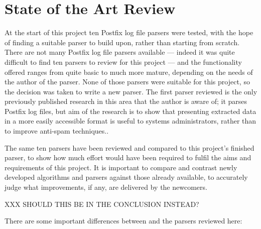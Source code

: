 \chapter{State of the Art Review}

\label{state of the art review}

At the start of this project ten Postfix log file parsers were tested, with
the hope of finding a suitable parser to build upon, rather than starting
from scratch.  There are not many Postfix log file parsers available ---
indeed it was quite difficult to find ten parsers to review for this
project --- and the functionality offered ranges from quite basic to much
more mature, depending on the needs of the author of the parser.  None of
those parsers were suitable for this project, so the decision was taken to
write a new parser.  The first parser reviewed is the only previously
published research in this area that the author is aware of; it parses
Postfix log files, but aim of the research is to show that presenting
extracted data in a more easily accessible format is useful to systems
administrators, rather than to improve anti-spam techniques..

The same ten parsers have been reviewed and compared to this project's
finished parser, to show how much effort would have been required to fulfil
the aims and requirements of this project.  It is important to compare and
contrast newly developed algorithms and parsers against those already
available, to accurately judge what improvements, if any, are delivered by
the newcomers.

XXX SHOULD THIS BE IN THE CONCLUSION INSTEAD\@?

There are some important differences between \parsername{} and the parsers
reviewed here:

